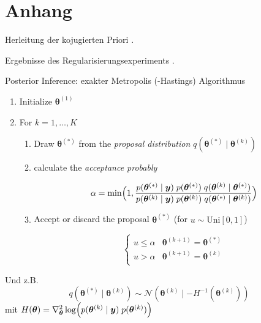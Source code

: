 \documentclass[
  ignorenonframetext,
  aspectratio=169,
]{beamer}
\providecommand{\tightlist}{%
  \setlength{\itemsep}{0pt}\setlength{\parskip}{0pt}}
\newcommand{\by}{\bm{y}}
\newcommand{\Ncal}{\mathcal{N}}
\newcommand{\btheta}{\bm{\theta}}
\begin{document}
\section{Anhang}\label{anhang}

\begin{frame}{Herleitung der kojugierten Priori}
\protect{}\label{herleitung-der-kojugierten-priori}
.
\end{frame}

\begin{frame}{Ergebnisse des Regularisierungsexperiments}
\protect{}\label{ergebnisse-des-regularisierungsexperiments}
.
\end{frame}

\begin{frame}{Posterior Inference: exakter Metropolis (-Hastings)
Algorithmus}
\protect{}\label{posterior-inference-exakter-metropolis--hastings-algorithmus}
\begin{enumerate}
\tightlist
\item
  Initialize \(\btheta^{(1)}\)
\item
  For \(k = 1, \dots, K\)

  \begin{enumerate}
  \item
    Draw \(\btheta^{(*)}\) from the \textit{proposal distribution}
    \(q(\btheta^{(*)} \mid \btheta^{(k)})\)
  \item
    calculate the \textit{acceptance probably}

    \[
         \alpha = \min \Bigl(
             1, \frac{
                 p(\btheta^{(*)} \mid \by)\; p(\btheta^{(*)}) \; q(\btheta^{(k)} \mid \btheta^{(*)})}{
                     p(\btheta^{(k)} \mid \by)\; p(\btheta^{(k)}) \; q(\btheta^{(*)} \mid \btheta^{(k)})
                 }
             \Bigr)
     \]
  \item
    Accept or discard the proposal \(\btheta^{(*)}\) (for
    \(u \sim \text{Uni}[0, 1]\))

    \[
     \begin{cases}
             u \le \alpha & \btheta^{(k+1)} = \btheta^{(*)}\\
             u > \alpha & \btheta^{(k+1)} = \btheta^{(k)}\\
     \end{cases}
     \]
  \end{enumerate}
\end{enumerate}

Und z.B. \[
q(\btheta^{(*)} \mid \btheta^{(k)}) \sim \Ncal(\btheta^{(k)} \mid -H^{-1}(\btheta^{(k)}))
\] mit
\(H(\btheta) = \nabla_{\btheta}^2  \log \Bigl(p(\btheta^{(k)} \mid \by)\; p(\btheta^{(k)})\Bigr)\)
\end{frame}
\end{document}
